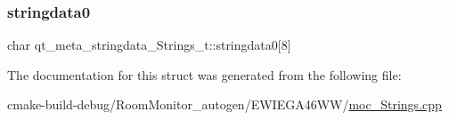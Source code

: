 \subsubsection{\texorpdfstring{stringdata0}{stringdata0}}
{\footnotesize\ttfamily char qt\+\_\+meta\+\_\+stringdata\+\_\+\+Strings\+\_\+t\+::stringdata0\mbox{[}8\mbox{]}}



The documentation for this struct was generated from the following file\+:\begin{DoxyCompactItemize}
\item 
cmake-\/build-\/debug/\+Room\+Monitor\+\_\+autogen/\+E\+W\+I\+E\+G\+A46\+W\+W/\hyperlink{moc___strings_8cpp}{moc\+\_\+\+Strings.\+cpp}\end{DoxyCompactItemize}
